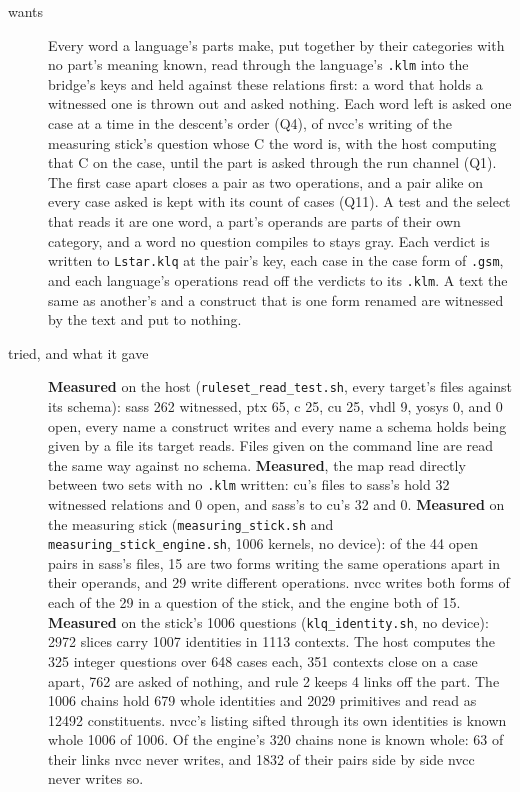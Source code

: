 \begin{description}
\item[{wants}] Every word a language's parts make, put together by their categories with no part's meaning known, read through the language's \texttt{.\allowbreak{}klm} into the bridge's keys and held against these relations first: a word that holds a witnessed one is thrown out and asked nothing. Each word left is asked one case at a time in the descent's order (Q4), of nvcc's writing of the measuring stick's question whose C the word is, with the host computing that C on the case, until the part is asked through the run channel (Q1). The first case apart closes a pair as two operations, and a pair alike on every case asked is kept with its count of cases (Q11). A test and the select that reads it are one word, a part's operands are parts of their own category, and a word no question compiles to stays gray. Each verdict is written to \texttt{Lstar.\allowbreak{}klq} at the pair's key, each case in the case form of \texttt{.\allowbreak{}gsm}, and each language's operations read off the verdicts to its \texttt{.\allowbreak{}klm}. A text the same as another's and a construct that is one form renamed are witnessed by the text and put to nothing.
\item[{tried, and what it gave}] \textbf{Measured} on the host (\texttt{ruleset\_\allowbreak{}read\_\allowbreak{}test.\allowbreak{}sh}, every target's files against its schema): sass 262 witnessed, ptx 65, c 25, cu 25, vhdl 9, yosys 0, and 0 open, every name a construct writes and every name a schema holds being given by a file its target reads. Files given on the command line are read the same way against no schema. \textbf{Measured}, the map read directly between two sets with no \texttt{.\allowbreak{}klm} written: cu's files to sass's hold 32 witnessed relations and 0 open, and sass's to cu's 32 and 0. \textbf{Measured} on the measuring stick (\texttt{measuring\_\allowbreak{}stick.\allowbreak{}sh} and \texttt{measuring\_\allowbreak{}stick\_\allowbreak{}engine.\allowbreak{}sh}, 1006 kernels, no device): of the 44 open pairs in sass's files, 15 are two forms writing the same operations apart in their operands, and 29 write different operations. nvcc writes both forms of each of the 29 in a question of the stick, and the engine both of 15. \textbf{Measured} on the stick's 1006 questions (\texttt{klq\_\allowbreak{}identity.\allowbreak{}sh}, no device): 2972 slices carry 1007 identities in 1113 contexts. The host computes the 325 integer questions over 648 cases each, 351 contexts close on a case apart, 762 are asked of nothing, and rule 2 keeps 4 links off the part. The 1006 chains hold 679 whole identities and 2029 primitives and read as 12492 constituents. nvcc's listing sifted through its own identities is known whole 1006 of 1006. Of the engine's 320 chains none is known whole: 63 of their links nvcc never writes, and 1832 of their pairs side by side nvcc never writes so.

\end{description}
